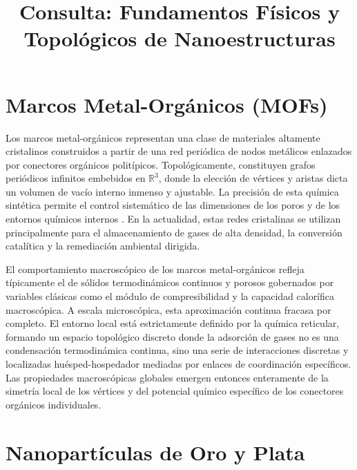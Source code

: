 \documentclass[pdflatex,sn-mathphys-num]{sn-jnl}
\theoremstyle{thmstyleone}%
\theoremstyle{thmstyletwo}%
\theoremstyle{thmstylethree}%
\begin{document}
\title[Nanoestructuras y Materiales Avanzados]{Consulta:
Fundamentos Físicos y Topológicos de Nanoestructuras}

\author{
}


\maketitle

\section{Marcos Metal-Orgánicos (MOFs)}
\label{sec:mof}

Los marcos metal-orgánicos representan una clase de materiales altamente
cristalinos construidos a partir de una red periódica de nodos metálicos
enlazados por conectores orgánicos politípicos. Topológicamente, constituyen
grafos periódicos infinitos embebidos en $\mathbb{R}^3$, donde la elección de
vértices y aristas dicta un volumen de vacío interno inmenso y ajustable. La
precisión de esta química sintética permite el control sistemático de las
dimensiones de los poros y de los entornos químicos internos
\cite{nandiRecentAdvancesMetalOrganic2024, terronMetalOrganicFrameworks2025}.
En la actualidad, estas redes cristalinas se utilizan
principalmente para el almacenamiento de gases de alta densidad, la conversión
catalítica y la remediación ambiental dirigida.

El comportamiento macroscópico de los marcos metal-orgánicos refleja
típicamente el de sólidos termodinámicos continuos y porosos gobernados por
variables clásicas como el módulo de compresibilidad y la capacidad calorífica
macroscópica. A escala microscópica, esta aproximación continua fracasa por
completo. El entorno local está estrictamente definido por la química reticular,
formando un espacio topológico discreto donde la adsorción de gases no es una
condensación termodinámica continua, sino una serie de interacciones discretas
y localizadas huésped-hospedador mediadas por enlaces de coordinación
específicos. Las propiedades macroscópicas globales emergen entonces enteramente
de la simetría local de los vértices y del potencial químico específico de los
conectores orgánicos individuales.

\section{Nanopartículas de Oro y Plata}
\label{sec:nanoparticulas}
\end{document}
